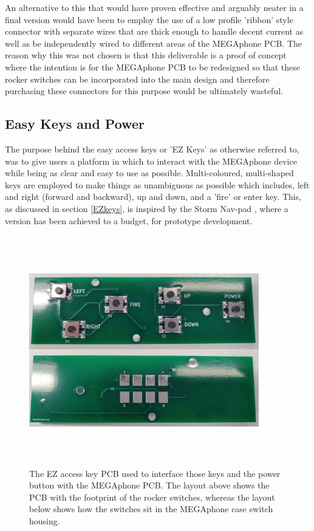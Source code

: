 An alternative to this that would have proven effective and arguably neater in a final version would have been to employ the use of a low profile 'ribbon' style connector with separate wires that are thick enough to handle decent current as well as be independently wired to different areas of the MEGAphone PCB.
The reason why this was not chosen is that this deliverable is a proof of concept where the intention is for the MEGAphone PCB to be redesigned so that these rocker switches can be incorporated into the main design and therefore purchasing these connectors for this purpose would be ultimately wasteful.

\subsection{Easy Keys and Power}

The purpose behind the easy access keys or 'EZ Keys' as otherwise referred to, was to give users a platform in which to interact with the MEGAphone device while being as clear and easy to use as possible.
Multi-coloured, multi-shaped keys are employed to make things as unambiguous as possible which includes, left and right (forward and backward), up and down, and a 'fire' or enter key.
This, as discussed in section \ref{EZkeys}, is inspired by the Storm Nav-pad \cite{navpad}, where a version has been achieved to a budget, for prototype development. %

\begin{figure} [h]
    \centering
    \includegraphics[width=10cm,height=10cm,keepaspectratio]{Figures/easykeypcb.png}
    \caption{The EZ access key PCB used to interface those keys and the power button with the MEGAphone PCB. The layout above shows the PCB with the footprint of the rocker switches, whereas the layout below shows how the switches sit in the MEGAphone case switch housing.}
    \label{fig:EZkeysPCB}
\end{figure}

